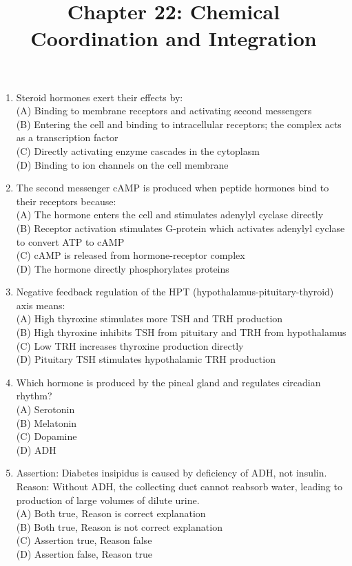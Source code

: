 \documentclass{article}
\begin{document}
\title{Chapter 22: Chemical Coordination and Integration}
\date{}
\maketitle

\begin{enumerate}[label=Q\arabic*.]

\item Steroid hormones exert their effects by:
\\(A) Binding to membrane receptors and activating second messengers
\\(B) Entering the cell and binding to intracellular receptors; the complex acts as a transcription factor
\\(C) Directly activating enzyme cascades in the cytoplasm
\\(D) Binding to ion channels on the cell membrane

\item The second messenger cAMP is produced when peptide hormones bind to their receptors because:
\\(A) The hormone enters the cell and stimulates adenylyl cyclase directly
\\(B) Receptor activation stimulates G-protein which activates adenylyl cyclase to convert ATP to cAMP
\\(C) cAMP is released from hormone-receptor complex
\\(D) The hormone directly phosphorylates proteins

\item Negative feedback regulation of the HPT (hypothalamus-pituitary-thyroid) axis means:
\\(A) High thyroxine stimulates more TSH and TRH production
\\(B) High thyroxine inhibits TSH from pituitary and TRH from hypothalamus
\\(C) Low TRH increases thyroxine production directly
\\(D) Pituitary TSH stimulates hypothalamic TRH production

\item Which hormone is produced by the pineal gland and regulates circadian rhythm?
\\(A) Serotonin
\\(B) Melatonin
\\(C) Dopamine
\\(D) ADH

\item Assertion: Diabetes insipidus is caused by deficiency of ADH, not insulin.\\
Reason: Without ADH, the collecting duct cannot reabsorb water, leading to production of large volumes of dilute urine.
\\(A) Both true, Reason is correct explanation
\\(B) Both true, Reason is not correct explanation
\\(C) Assertion true, Reason false
\\(D) Assertion false, Reason true


\end{enumerate}
\end{document}
